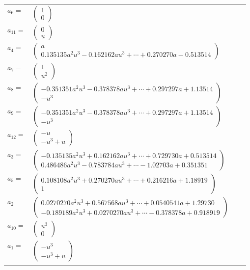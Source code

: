 \documentclass[1p]{elsarticle_modified}
\theoremstyle{definition}
\begin{document}
\begin{tabular}{m{7pt} m{180pt} m{7pt} m{180pt} }
\flushright $a_{6}=$&$\begin{pmatrix}1\\0\end{pmatrix}$ \\
\flushright $a_{11}=$&$\begin{pmatrix}0\\u\end{pmatrix}$ \\
\flushright $a_{4}=$&$\begin{pmatrix}a\\0.135135 a^{2} u^{3}-0.162162 a u^{3}+\cdots+0.270270 a-0.513514\end{pmatrix}$ \\
\flushright $a_{7}=$&$\begin{pmatrix}1\\u^2\end{pmatrix}$ \\
\flushright $a_{8}=$&$\begin{pmatrix}-0.351351 a^{2} u^{3}-0.378378 a u^{3}+\cdots+0.297297 a+1.13514\\- u^3\end{pmatrix}$ \\
\flushright $a_{9}=$&$\begin{pmatrix}-0.351351 a^{2} u^{3}-0.378378 a u^{3}+\cdots+0.297297 a+1.13514\\- u^3\end{pmatrix}$ \\
\flushright $a_{12}=$&$\begin{pmatrix}- u\\- u^3+u\end{pmatrix}$ \\
\flushright $a_{3}=$&$\begin{pmatrix}-0.135135 a^{2} u^{3}+0.162162 a u^{3}+\cdots+0.729730 a+0.513514\\0.486486 a^{2} u^{3}-0.783784 a u^{3}+\cdots-1.02703 a+0.351351\end{pmatrix}$ \\
\flushright $a_{5}=$&$\begin{pmatrix}0.108108 a^{2} u^{3}+0.270270 a u^{3}+\cdots+0.216216 a+1.18919\\1\end{pmatrix}$ \\
\flushright $a_{2}=$&$\begin{pmatrix}0.0270270 a^{2} u^{3}+0.567568 a u^{3}+\cdots+0.0540541 a+1.29730\\-0.189189 a^{2} u^{3}+0.0270270 a u^{3}+\cdots-0.378378 a+0.918919\end{pmatrix}$ \\
\flushright $a_{10}=$&$\begin{pmatrix}u^3\\0\end{pmatrix}$ \\
\flushright $a_{1}=$&$\begin{pmatrix}- u^3\\- u^3+u\end{pmatrix}$\\&\end{tabular}
\end{document}

